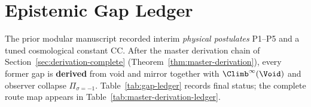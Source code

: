 \section{Epistemic Gap Ledger}
\label{sec:gap-ledger}

The prior modular manuscript recorded interim \emph{physical postulates}
P1--P5 and a tuned cosmological constant CC. After the master derivation
chain of Section~\ref{sec:derivation-complete}
(Theorem~\ref{thm:master-derivation}), every former gap is \textbf{derived}
from void and mirror together with $\Climb^\infty(\Void)$ and observer collapse
$\Pi_{\sigma=-1}$. Table~\ref{tab:gap-ledger} records final status; the
complete route map appears in Table~\ref{tab:master-derivation-ledger}.

